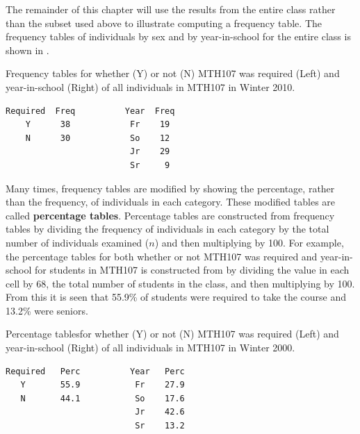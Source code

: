 \documentclass[10pt,openany]{book}\usepackage[]{graphicx}\usepackage[]{color}
\begin{document}
The remainder of this chapter will use the results from the entire class rather than the subset used above to illustrate computing a frequency table.  The frequency tables of individuals by sex and by year-in-school for the entire class is shown in .

\begin{table}[htbp]
  \caption{Frequency tables for whether (Y) or not (N) MTH107 was required (Left) and year-in-school (Right) of all individuals in MTH107 in Winter 2010.}
  \label{tab:Mth107Freq}
  \centering
  \begin{Verbatim}[xleftmargin=5mm]
Required  Freq          Year  Freq
    Y      38            Fr    19
    N      30            So    12
                         Jr    29
                         Sr     9
   \end{Verbatim}
\end{table}

Many times, frequency tables are modified by showing the percentage, rather than the frequency, of individuals in each category.  These modified tables are called \textbf{percentage tables}.  Percentage tables are constructed from frequency tables by dividing the frequency of individuals in each category by the total number of individuals examined ($n$) and then multiplying by 100.  For example, the percentage tables for both whether or not MTH107 was required and year-in-school  for students in MTH107 is constructed from  by dividing the value in each cell by 68, the total number of students in the class, and then multiplying by 100.  From this it is seen that 55.9\% of students were required to take the course and 13.2\% were seniors.

\begin{table}[htbp]
  \caption{Percentage tablesfor whether (Y) or not (N) MTH107 was required (Left) and year-in-school (Right) of all individuals in MTH107 in Winter 2000.}
  \label{tab:Mth107Prop}
  \centering
  \begin{Verbatim}[xleftmargin=5mm]
Required   Perc          Year   Perc
   Y       55.9           Fr    27.9
   N       44.1           So    17.6
                          Jr    42.6
                          Sr    13.2
  \end{Verbatim}
\end{table}

\end{document}
